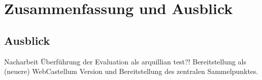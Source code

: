 \chapter{Zusammenfassung und Ausblick}



\section{Ausblick}

\begin{neu}
  Nacharbeit Überführung der Evaluation als arquillian test?!
  Bereitstellung als (neuere) WebCastellum Version und Bereitstellung des zentralen Sammelpunktes.
\end{neu}

